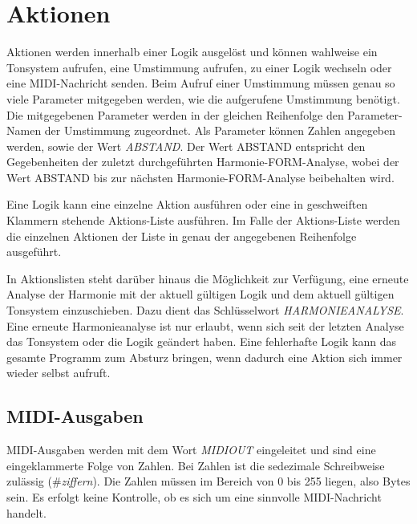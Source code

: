 \section{Aktionen}\label{sec:aktionen}

Aktionen werden innerhalb einer Logik ausgelöst und können wahlweise
ein Tonsystem aufrufen, eine Umstimmung aufrufen,
zu einer Logik wechseln oder eine MIDI-Nachricht
senden. Beim Aufruf einer Umstimmung müssen genau so viele Parameter
mitgegeben werden, wie die aufgerufene Umstimmung benötigt. Die mitgegebenen
Parameter werden in der gleichen Reihenfolge den Parameter-Namen
der Umstimmung zugeordnet. Als Parameter können Zahlen angegeben werden,
sowie der Wert \emph{ABSTAND}.
Der Wert ABSTAND entspricht den Gegebenheiten der
zuletzt durchgeführten Harmonie-FORM-Analyse, wobei der Wert
ABSTAND bis zur nächsten Harmonie-FORM-Analyse beibehalten wird.

Eine Logik kann eine einzelne Aktion ausführen oder eine in geschweiften
Klammern stehende Aktions-Liste aus\-füh\-ren. Im Falle der Aktions-Liste
werden die einzelnen Aktionen der Liste in genau der angegebenen
Reihenfolge ausgeführt.

In Aktionslisten steht darüber hinaus die Möglichkeit zur Verfügung,
eine erneute Analyse der Harmonie mit der aktuell gültigen Logik und
dem aktuell gültigen Tonsystem einzuschieben. Dazu dient das
Schlüsselwort \emph{HARMONIEANALYSE}. Eine erneute Harmonieanalyse ist nur
erlaubt, wenn sich seit der letzten Analyse das Tonsystem oder die
Logik geändert haben. Eine fehlerhafte Logik kann das gesamte Programm
zum Absturz bringen, wenn dadurch eine Aktion sich immer wieder selbst
aufruft.


\subsection{MIDI-Ausgaben}\label{sec:midi-ausgaben}

MIDI-Ausgaben werden mit dem Wort \emph{MIDIOUT}
 eingeleitet und
sind eine eingeklammerte Folge von Zahlen. Bei Zahlen ist die sedezimale
Schreibweise zulässig (\#\emph{ziffern}). Die Zahlen
müssen im Bereich von 0 bis 255 liegen, also Bytes sein. Es erfolgt keine
Kontrolle, ob es sich um eine sinnvolle MIDI-Nachricht handelt.

    

